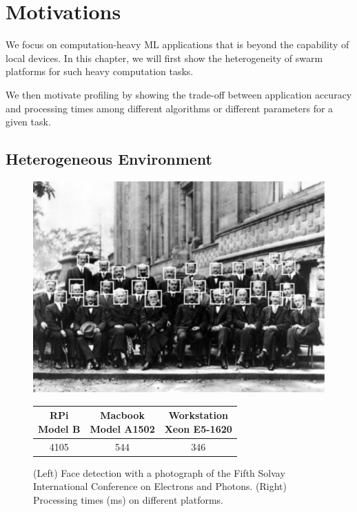 \section{Motivations}
\label{sec:motivation}

We focus on computation-heavy ML applications that is beyond the capability of
local devices. In this chapter, we will first show the heterogeneity of swarm
platforms for such heavy computation tasks.

We then motivate profiling by showing the trade-off between application accuracy
and processing times among different algorithms or different parameters for a
given task.

\subsection{Heterogeneous Environment}

\begin{figure}
  \begin{minipage}{0.4\textwidth}
    \includegraphics[width=.9\columnwidth]{figures/physicist.pdf}
    \label{fig:physicist}
  \end{minipage}%
  \begin{minipage}{0.6\textwidth}
    \begin{tabular}{c c c}
      \toprule
      \specialcell{RPi\\Model B}
      & \specialcell{Macbook \\ Model A1502}
      & \specialcell{Workstation\\Xeon E5-1620} \\
      \midrule
      4105 & 544 & 346 \\
      \bottomrule
    \end{tabular}
  \end{minipage}
  \caption{(Left) Face detection with a photograph of the Fifth Solvay
    International Conference on Electrons and Photons. (Right) Processing times
    (ms) on different platforms.}
\end{figure}

